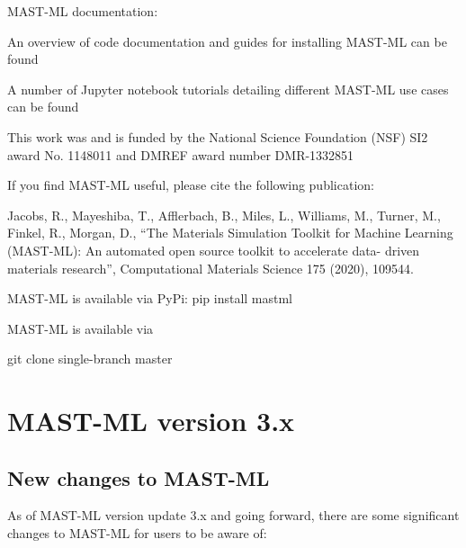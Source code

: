 \documentclass[letterpaper,10pt,english]{sphinxmanual}
\begin{document}
MAST-ML documentation:

An overview of code documentation and guides for installing MAST-ML can be found 

A number of Jupyter notebook tutorials detailing different MAST-ML use cases can be found 


This work was and is funded by the National Science Foundation (NSF) SI2 award No. 1148011 and DMREF award number DMR-1332851


If you find MAST-ML useful, please cite the following publication:

Jacobs, R., Mayeshiba, T., Afflerbach, B., Miles, L., Williams, M., Turner, M., Finkel, R., Morgan, D., “The Materials Simulation Toolkit for Machine Learning (MAST-ML): An automated open source toolkit to accelerate data- driven materials research”, Computational Materials Science 175 (2020), 109544. 


MAST-ML is available via PyPi: pip install mastml

MAST-ML is available via 

git clone \textendash{}single-branch master 


\chapter{MAST-ML version 3.x}
\label{\detokenize{0_4_majorchanges:mast-ml-version-3-x}}\label{\detokenize{0_4_majorchanges::doc}}

\section{New changes to MAST-ML}
\label{\detokenize{0_4_majorchanges:new-changes-to-mast-ml}}
As of MAST-ML version update 3.x and going forward, there are some significant changes to MAST-ML for users to
be aware of:
\end{document}
